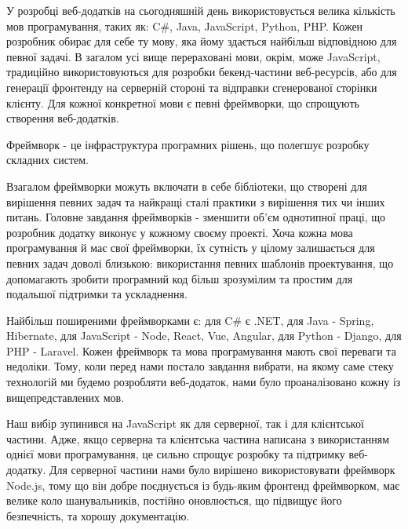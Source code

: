 У розробці веб-додатків на сьогодняшній день використовується велика кількість мов програмування, таких як: C\#, Java, JavaScript, Python, PHP. Кожен розробник обирає для себе ту мову, яка йому здається найбільш відповідною для певної задачі. В загалом усі вище перераховані мови, окрім, може JavaScript, традиційно використовуються для розробки бекенд-частини веб-ресурсів, або для генерації фронтенду на серверній стороні та відправки сгенерованої сторінки клієнту. Для кожної конкретної мови є певні фреймворки, що спрощують створення веб-додатків.

Фреймворк - це інфраструктура програмних рішень, що полегшує розробку складних систем.

Взагалом фреймворки можуть включати в себе бібліотеки, що створені для вирішення певних задач та найкращі сталі практики з вирішення тих чи інших питань. Головне завдання фреймворків - зменшити об'єм однотипної праці, що розробник додатку виконує у кожному своєму проекті. Хоча кожна мова програмування й має свої фреймворки, їх сутність у цілому залишається для певних задач доволі близькою: використання певних шаблонів проектування, що допомагають зробити програмний код більш зрозумілим та простим для подальшої підтримки та ускладнення.

Найбільш поширеними фреймворками є: для C\# є .NET, для Java - Spring, Hibernate, для JavaScript - Node, React, Vue, Angular, для Python - Django, для PHP - Laravel. Кожен фреймворк та мова програмування мають свої переваги та недоліки. Тому, коли перед нами постало завдання вибрати, на якому саме стеку технологій ми будемо розробляти веб-додаток, нами було проаналізовано кожну із вищепредставлених мов.

Наш вибір зупинився на JavaScript як для серверної, так і для клієнтської частини. Адже, якщо серверна та клієнтська частина написана з використанням однієї мови програмування, це сильно спрощує розробку та підтримку веб-додатку. Для серверної частини нами було вирішено використовувати фреймворк Node.js, тому що він добре поєднується із будь-яким фронтенд фреймворком, має велике коло шанувальників, постійно оновлюється, що підвищує його безпечність, та хорошу документацію.  
